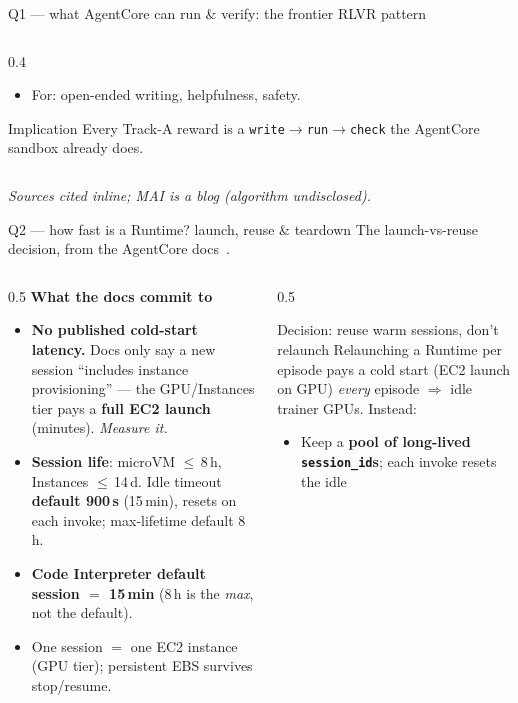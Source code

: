 \documentclass[aspectratio=169]{beamer}
\begin{document}
\begin{frame}{Q1 --- what AgentCore can run \& verify: the frontier RLVR pattern}
\begin{columns}[T]
\begin{column}{0.4\textwidth}
\begin{itemize}
        \item For: open-ended writing, helpfulness, safety.
      \end{itemize}
      \begin{block}{Implication}
        \scriptsize Every Track-A reward is a \texttt{write}$\to$\texttt{run}$\to$\texttt{check}
        the AgentCore sandbox already does.
      \end{block}
    \end{column}
  \end{columns}
  \vspace{-0.6em}
  {\scriptsize\itshape Sources cited inline; MAI is a blog (algorithm undisclosed).}
\end{frame}

\begin{frame}{Q2 --- how fast is a Runtime? launch, reuse \& teardown}
  \footnotesize The launch-vs-reuse decision, from the AgentCore docs~\cite{ac-howitworks,ac-instances}.
  \begin{columns}[T]
    \begin{column}{0.5\textwidth}
      \textbf{What the docs commit to}
      \begin{itemize}\scriptsize\setlength\itemsep{0.12em}
        \item \textbf{No published cold-start latency.} Docs only say a new session ``includes instance
          provisioning'' --- the GPU/Instances tier pays a \textbf{full EC2 launch} (minutes). \emph{Measure it.}
        \item \textbf{Session life}: microVM $\le$\,8\,h, Instances $\le$\,14\,d. Idle timeout
          \textbf{default 900\,s} (15\,min), resets on each invoke; max-lifetime default 8\,h.
        \item \textbf{Code Interpreter default session $=$ 15\,min} (8\,h is the \emph{max}, not the default).
        \item One session $=$ one EC2 instance (GPU tier); persistent EBS survives stop/resume.
      \end{itemize}
    \end{column}
    \begin{column}{0.5\textwidth}
      \begin{block}{Decision: reuse warm sessions, don't relaunch}
        \scriptsize Relaunching a Runtime per episode pays a cold start (EC2 launch on GPU) \emph{every}
        episode $\Rightarrow$ idle trainer GPUs. Instead:
        \begin{itemize}\setlength\itemsep{0.06em}
          \item Keep a \textbf{pool of long-lived \texttt{session\_id}s}; each invoke resets the idle

\end{itemize}
\end{block}
\end{column}
\end{columns}
\end{frame}
\end{document}

